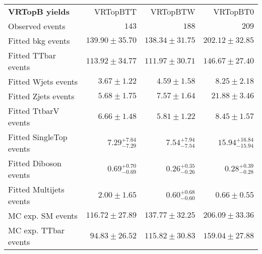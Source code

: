 

\begin{table}
\begin{center}
\setlength{\tabcolsep}{0.0pc}
{\small
\begin{tabular*}{\textwidth}{@{\extracolsep{\fill}}lrrr}
\noalign{\smallskip}\hline\noalign{\smallskip}
{\bf VRTopB yields}           & VRTopBTT            & VRTopBTW            & VRTopBT0              \\[-0.05cm]
\noalign{\smallskip}\hline\noalign{\smallskip}
Observed events          & $143$              & $188$              & $209$                    \\
\noalign{\smallskip}\hline\noalign{\smallskip}
Fitted bkg events         & $139.90 \pm 35.70$          & $138.34 \pm 31.75$          & $202.12 \pm 32.85$              \\
\noalign{\smallskip}\hline\noalign{\smallskip}
        Fitted TTbar events         & $113.92 \pm 34.77$          & $111.97 \pm 30.71$          & $146.67 \pm 27.40$              \\
        Fitted Wjets events         & $3.67 \pm 1.22$          & $4.59 \pm 1.58$          & $8.25 \pm 2.18$              \\
        Fitted Zjets events         & $5.68 \pm 1.75$          & $7.57 \pm 1.64$          & $21.88 \pm 3.46$              \\
        Fitted TtbarV events         & $6.66 \pm 1.48$          & $5.81 \pm 1.22$          & $8.45 \pm 1.57$              \\
        Fitted SingleTop events         & $7.29_{-7.29}^{+7.64}$          & $7.54_{-7.54}^{+7.94}$          & $15.94_{-15.94}^{+16.84}$              \\
        Fitted Diboson events         & $0.69_{-0.69}^{+0.70}$          & $0.26_{-0.26}^{+0.35}$          & $0.28_{-0.28}^{+0.39}$              \\
        Fitted Multijets events         & $2.00 \pm 1.65$          & $0.60_{-0.60}^{+0.68}$          & $0.66 \pm 0.55$              \\
 \noalign{\smallskip}\hline\noalign{\smallskip}
MC exp. SM events              & $116.72 \pm 27.89$          & $137.77 \pm 32.25$          & $206.09 \pm 33.36$              \\
\noalign{\smallskip}\hline\noalign{\smallskip}
        MC exp. TTbar events         & $94.83 \pm 26.52$          & $115.82 \pm 30.83$          & $159.04 \pm 27.88$              \\

\end{tabular*}}
\end{center}
\end{table}
